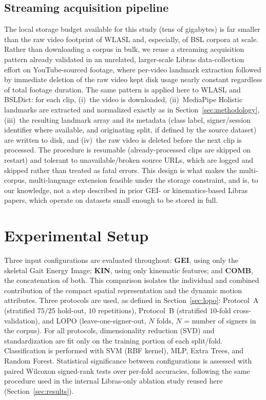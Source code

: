 \documentclass[journal]{IEEEtran}
\begin{document}
\subsection{Streaming acquisition pipeline}
\label{sec:acquisition}
The local storage budget available for this study (tens of gigabytes) is far smaller than the raw video footprint of WLASL and, especially, of BSL corpora at scale. Rather than downloading a corpus in bulk, we reuse a streaming acquisition pattern already validated in an unrelated, larger-scale Libras data-collection effort on YouTube-sourced footage, where per-video landmark extraction followed by immediate deletion of the raw video kept disk usage nearly constant regardless of total footage duration. The same pattern is applied here to WLASL and BSLDict: for each clip, (i)~the video is downloaded, (ii)~MediaPipe Holistic landmarks are extracted and normalized exactly as in Section~\ref{sec:methodology}, (iii)~the resulting landmark array and its metadata (class label, signer/session identifier where available, and originating split, if defined by the source dataset) are written to disk, and (iv)~the raw video is deleted before the next clip is processed. The procedure is resumable (already-processed clips are skipped on restart) and tolerant to unavailable/broken source URLs, which are logged and skipped rather than treated as fatal errors. This design is what makes the multi-corpus, multi-language extension feasible under the storage constraint, and is, to our knowledge, not a step described in prior GEI- or kinematics-based Libras papers, which operate on datasets small enough to be stored in full.

\section{Experimental Setup}
\label{sec:setup}

Three input configurations are evaluated throughout: \textbf{GEI}, using only the skeletal Gait Energy Image; \textbf{KIN}, using only kinematic features; and \textbf{COMB}, the concatenation of both. This comparison isolates the individual and combined contribution of the compact spatial representation and the dynamic motion attributes. Three protocols are used, as defined in Section~\ref{sec:lopo}: Protocol~A (stratified $75/25$ hold-out, $10$ repetitions), Protocol~B (stratified $10$-fold cross-validation), and LOPO (leave-one-signer-out, $N$ folds, $N$ = number of signers in the corpus). For all protocols, dimensionality reduction (SVD) and standardization are fit only on the training portion of each split/fold. Classification is performed with SVM (RBF kernel), MLP, Extra Trees, and Random Forest. Statistical significance between configurations is assessed with paired Wilcoxon signed-rank tests over per-fold accuracies, following the same procedure used in the internal Libras-only ablation study reused here (Section~\ref{sec:results}).
\end{document}
